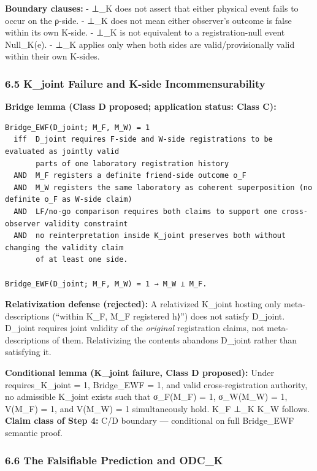 \documentclass[
  11pt,
]{article}
\begin{document}
\textbf{Boundary clauses:} - ⊥\_K does not assert that either physical
event fails to occur on the ρ-side. - ⊥\_K does not mean either
observer's outcome is false within its own K-side. - ⊥\_K is not
equivalent to a registration-null event Null\_K(e). - ⊥\_K applies only
when both sides are valid/provisionally valid within their own K-sides.

\subsubsection{6.5 K\_joint Failure and K-side
Incommensurability}\label{k_joint-failure-and-k-side-incommensurability}

\textbf{Bridge lemma (Class D proposed; application status: Class C):}

\begin{verbatim}
Bridge_EWF(D_joint; M_F, M_W) = 1
  iff  D_joint requires F-side and W-side registrations to be evaluated as jointly valid
       parts of one laboratory registration history
  AND  M_F registers a definite friend-side outcome o_F
  AND  M_W registers the same laboratory as coherent superposition (no definite o_F as W-side claim)
  AND  LF/no-go comparison requires both claims to support one cross-observer validity constraint
  AND  no reinterpretation inside K_joint preserves both without changing the validity claim
       of at least one side.

Bridge_EWF(D_joint; M_F, M_W) = 1 → M_W ⊥ M_F.
\end{verbatim}

\textbf{Relativization defense (rejected):} A relativized K\_joint
hosting only meta-descriptions (``within K\_F, M\_F registered
\textbar h⟩'') does not satisfy D\_joint. D\_joint requires joint
validity of the \emph{original} registration claims, not
meta-descriptions of them. Relativizing the contents abandons D\_joint
rather than satisfying it.

\textbf{Conditional lemma (K\_joint failure, Class D proposed):} Under
requires\_K\_joint = 1, Bridge\_EWF = 1, and valid cross-registration
authority, no admissible K\_joint exists such that σ\_F(M\_F) = 1,
σ\_W(M\_W) = 1, V(M\_F) = 1, and V(M\_W) = 1 simultaneously hold. K\_F
⊥\_K K\_W follows. \textbf{Claim class of Step 4:} C/D boundary ---
conditional on full Bridge\_EWF semantic proof.

\subsubsection{6.6 The Falsifiable Prediction and
ODC\_K}\label{the-falsifiable-prediction-and-odc_k}
\end{document}
